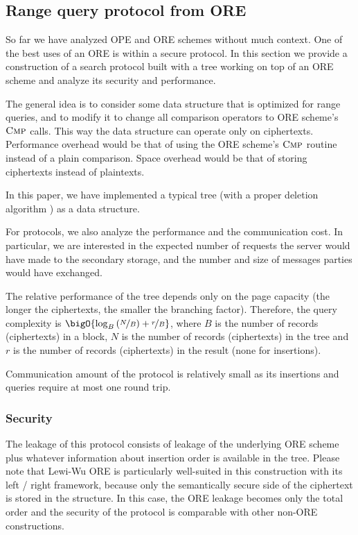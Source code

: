 \subsection{Range query protocol from ORE}\label{sec:ore-to-protocol}

	So far we have analyzed OPE and ORE schemes without much context.
	One of the best uses of an ORE is within a secure protocol.
	In this section we provide a construction of a search protocol built with a {\BPlus} tree working on top of an ORE scheme and analyze its security and performance.

	The general idea is to consider some data structure that is optimized for range queries, and to modify it to change all comparison operators to ORE scheme's $\textsc{Cmp}$ calls.
	This way the data structure can operate only on ciphertexts.
	Performance overhead would be that of using the ORE scheme's $\textsc{Cmp}$ routine instead of a plain comparison.
	Space overhead would be that of storing ciphertexts instead of plaintexts.

	In this paper, we have implemented a typical {\BPlus} tree \cite{b-tree} (with a proper deletion algorithm \cite{b-plus-tree-deletion}) as a data structure.

	For protocols, we also analyze the {\IO} performance and the communication cost.
	In particular, we are interested in the expected number of {\IO} requests the server would have made to the secondary storage, and the number and size of messages parties would have exchanged.

	The relative performance of the {\BPlus} tree depends only on the page capacity (the longer the ciphertexts, the smaller the branching factor). 	Therefore, the query complexity is $\bigO{\log_B \left( \nicefrac{N}{B} \right) + \nicefrac{r}{B}}$, where $B$ is the number of records (ciphertexts) in a block, $N$ is the number of records (ciphertexts) in the tree and $r$ is the number of records (ciphertexts) in the result (none for insertions).

	Communication amount of the protocol is relatively small as its insertions and queries require at most one round trip.

	\subsubsection{Security}
		The leakage of this protocol consists of leakage of the underlying ORE scheme plus whatever information about insertion order is available in the {\BPlus} tree.
		Please note that Lewi-Wu \cite{lewi-wu-ore} ORE is particularly well-suited in this construction with its left / right framework, because only the semantically secure side of the ciphertext is stored in the structure.
		In this case, the ORE leakage becomes only the total order and the security of the protocol is comparable with other non-ORE constructions.
